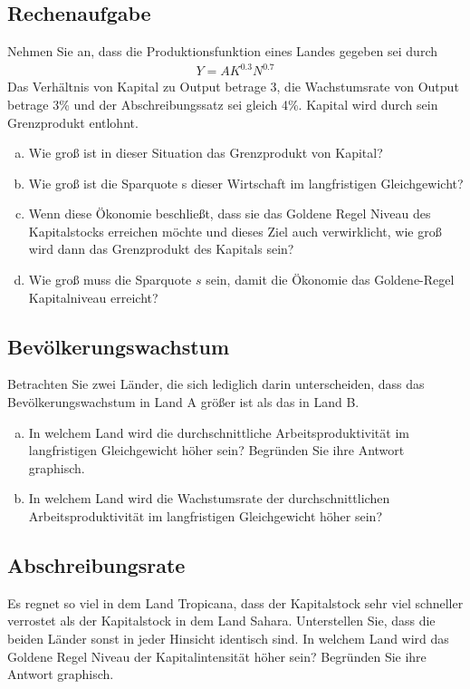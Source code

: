 \documentclass{scrartcl}
\begin{document}
\subsection{Rechenaufgabe}
Nehmen Sie an, dass die Produktionsfunktion eines Landes gegeben sei durch
\begin{align*}
  Y = A K^{0.3}N^{0.7}
\end{align*}
Das Verhältnis von Kapital zu Output betrage 3, die Wachstumsrate von Output betrage 3\% und der Abschreibungssatz sei gleich 4\%. Kapital wird durch sein Grenzprodukt entlohnt.
\begin{enumerate}[(a)]
  \item Wie groß ist in dieser Situation das Grenzprodukt von Kapital? %
  \item Wie groß ist die Sparquote s dieser Wirtschaft im langfristigen Gleichgewicht? %
  \item Wenn diese Ökonomie beschließt, dass sie das Goldene Regel Niveau des Kapitalstocks erreichen möchte und dieses Ziel auch verwirklicht, wie groß wird dann das Grenzprodukt des Kapitals sein? %
  \item Wie groß muss die Sparquote $s$ sein, damit die Ökonomie das Goldene-Regel Kapitalniveau erreicht? %
\end{enumerate}


\subsection{Bevölkerungswachstum}
Betrachten Sie zwei Länder, die sich lediglich darin unterscheiden, dass das Bevölkerungswachstum in Land A größer ist als das in Land B.
\begin{enumerate}[(a)]
  \item In welchem Land wird die durchschnittliche Arbeitsproduktivität im langfristigen Gleichgewicht höher sein? Begründen Sie ihre Antwort graphisch.
  \item In welchem Land wird die Wachstumsrate der durchschnittlichen Arbeitsproduktivität im langfristigen Gleichgewicht höher sein?
\end{enumerate}

\subsection{Abschreibungsrate}
Es regnet so viel in dem Land Tropicana, dass der Kapitalstock sehr viel schneller verrostet als der Kapitalstock in dem Land Sahara. Unterstellen Sie, dass die beiden Länder sonst in jeder Hinsicht identisch sind. In welchem Land wird das Goldene Regel Niveau der Kapitalintensität höher sein? Begründen Sie ihre Antwort graphisch.
\end{document}
